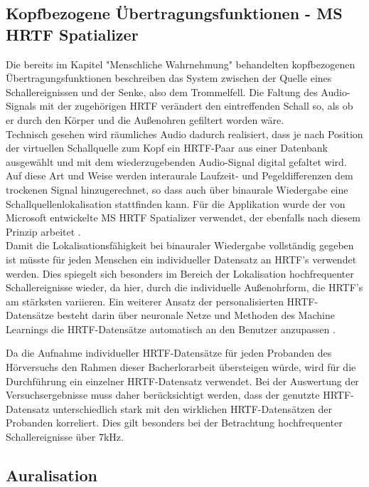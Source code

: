  \subsection{Kopfbezogene Übertragungsfunktionen - MS HRTF Spatializer}
 
 Die bereits im Kapitel "Menschliche Wahrnehmung" behandelten kopfbezogenen Übertragungsfunktionen beschreiben das System zwischen der Quelle eines Schallereignissen und der Senke, also dem Trommelfell. Die Faltung des Audio-Signals mit der zugehörigen HRTF verändert den eintreffenden Schall so, als ob er durch den Körper und die Außenohren gefiltert worden wäre. \\
 
Technisch gesehen wird räumliches Audio dadurch realisiert, dass je nach Position der virtuellen Schallquelle zum Kopf ein HRTF-Paar aus einer Datenbank ausgewählt und mit dem wiederzugebenden Audio-Signal digital gefaltet wird. Auf diese Art und Weise werden interaurale Laufzeit- und Pegeldifferenzen dem trockenen Signal hinzugerechnet, so dass auch über  binaurale Wiedergabe eine Schallquellenlokalisation stattfinden kann. Für die Applikation wurde der von Microsoft entwickelte \glqq  MS HRTF Spatializer \grqq{} verwendet, der ebenfalls nach diesem Prinzip arbeitet \cite{MSHRTF}.\\
 
Damit die Lokalisationsfähigkeit bei binauraler Wiedergabe vollständig gegeben ist müsste für jeden Menschen ein individueller Datensatz an HRTF's verwendet werden. Dies spiegelt sich besonders im Bereich der Lokalisation hochfrequenter Schallereignisse wieder, da hier, durch die individuelle Außenohrform, die HRTF's am stärksten variieren. Ein weiterer Ansatz der personalisierten HRTF-Datensätze besteht darin über neuronale Netze und Methoden des Machine Learnings die HRTF-Datensätze automatisch an den Benutzer anzupassen \cite{MSHRTF}.
 
Da die Aufnahme individueller HRTF-Datensätze für jeden Probanden des Hörversuchs den Rahmen dieser Bacherlorarbeit übersteigen würde, wird für die Durchführung ein einzelner HRTF-Datensatz verwendet. Bei der Auswertung der Versuchsergebnisse muss daher berücksichtigt werden, dass der genutzte HRTF-Datensatz unterschiedlich stark mit den wirklichen HRTF-Datensätzen der Probanden korreliert. Dies gilt besonders bei der Betrachtung hochfrequenter Schallereignisse über 7kHz. 
 
 \subsection{Auralisation} 

